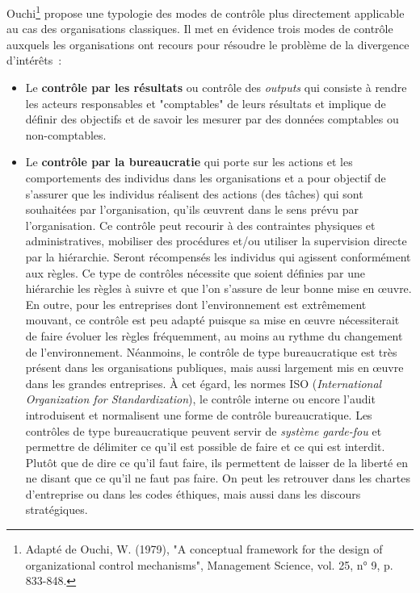 \documentclass[oneside]{kaobook}
\begin{document}
Ouchi\footnote{Adapté de Ouchi, W. (1979), "A conceptual framework for the design of organizational control mechanisms", Management Science, vol. 25, n° 9, p. 833-848.} propose une typologie des modes de contrôle plus directement applicable au cas des organisations classiques. Il met en évidence trois modes de contrôle auxquels les organisations ont recours pour résoudre le problème de la divergence d'intérêts :
\begin{itemize}
\item Le \textbf{contrôle par les résultats} ou contrôle des \emph{outputs} qui consiste à rendre les acteurs responsables et "comptables" de leurs résultats et implique de définir des objectifs et de savoir les mesurer par des données comptables ou non-comptables.
\item Le \textbf{contrôle par la bureaucratie} qui porte sur les actions et les comportements des individus dans les organisations et a pour objectif de s'assurer que les individus réalisent des actions (des tâches) qui sont souhaitées par l'organisation, qu'ils œuvrent dans le sens prévu par l'organisation. Ce contrôle peut recourir à des contraintes physiques et administratives, mobiliser des procédures et/ou utiliser la supervision directe par la hiérarchie. Seront récompensés les individus qui agissent conformément aux règles. Ce type de contrôles nécessite que soient définies par une hiérarchie les règles à suivre et que l'on s'assure de leur bonne mise en œuvre. En outre, pour les entreprises dont l'environnement est extrêmement mouvant, ce contrôle est peu adapté puisque sa mise en œuvre nécessiterait de faire évoluer les règles fréquemment, au moins au rythme du changement de l'environnement. Néanmoins, le contrôle de type bureaucratique est très présent dans les organisations publiques, mais aussi largement mis en œuvre dans les grandes entreprises. À cet égard, les normes ISO (\emph{International Organization for Standardization}), le contrôle interne ou encore l'audit introduisent et normalisent une forme de contrôle bureaucratique. Les contrôles de type bureaucratique peuvent servir de \emph{système garde-fou} et permettre de délimiter ce qu'il est possible de faire et ce qui est interdit. Plutôt que de dire ce qu'il faut faire, ils permettent de laisser de la liberté en ne disant que ce qu'il ne faut pas faire. On peut les retrouver dans les chartes d'entreprise ou dans les codes éthiques, mais aussi dans les discours stratégiques.

\end{itemize}
\end{document}
